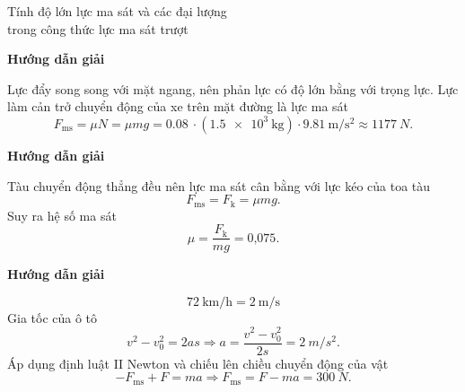\begin{dang}{Tính độ lớn lực ma sát và các đại lượng\\ trong công thức lực ma sát trượt}
	{	\begin{center}
			\textbf{Hướng dẫn giải}
		\end{center}
		
		Lực đẩy song song với mặt ngang, nên phản lực có độ lớn bằng với trọng lực. Lực làm cản trở chuyển động của xe trên mặt đường là lực ma sát
		\begin{equation*}
			F_{\text{ms}} =\mu N = \mu  mg =\SI{0.08}{}\cdot(\SI{1.5e3}{\kilogram})\cdot\SI{9.81}{\meter/\second^{2}}\approx \SI{1177}{N}.
		\end{equation*}
		
		
	}
	{	\begin{center}
			\textbf{Hướng dẫn giải}
		\end{center}
		
		Tàu chuyển động thẳng đều nên lực ma sát cân bằng với lực kéo của toa tàu
		\begin{equation*}
			F_{\text{ms}} = F_{\text{k}} = \mu mg.
		\end{equation*}
		Suy ra hệ số ma sát
		\begin{equation*}
			\mu = \dfrac{F_{\text{k}}}{mg} = \text{0,075}.
		\end{equation*} 
	}
	{	\begin{center}
			\textbf{Hướng dẫn giải}
		\end{center}
		$$\SI{72}{\kilo\meter/\hour}=\SI{2}{\meter/\second}$$
		Gia tốc của ô tô 
		\begin{equation*}
			v^2-v^2_0 = 2as \Rightarrow a = \dfrac{v^2-v^2_0}{2s} = \SI{2}{m/s^2}.
		\end{equation*}
		Áp dụng định luật II Newton và chiếu lên chiều chuyển động của vật
		\begin{equation*}
			-F_{\text{ms}}+F = ma \Rightarrow F_{\text{ms}} = F-ma = \SI{300}{N}.
		\end{equation*}
		
	}
\end{dang}
